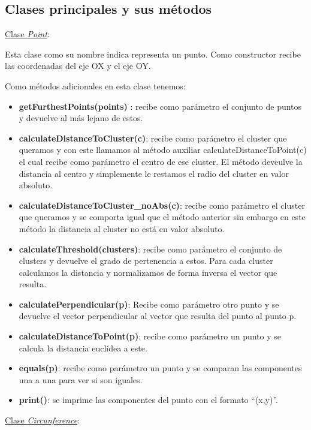 \documentclass[conference,a4paper]{IEEEtran}
\begin{document}
\subsection{Clases principales y sus métodos}

\underline{Clase \textit{Point}}:

Esta clase como su nombre indica representa un punto. Como constructor recibe las coordenadas del eje OX y el eje OY.

Como métodos adicionales en esta clase tenemos:

\begin{itemize}

	\item{\textbf{getFurthestPoints(points)	}: recibe como parámetro el conjunto de puntos y devuelve al más lejano de estos.}
	\item{\textbf{calculateDistanceToCluster(c)}: recibe como parámetro el cluster que queramos y con este llamamos al método auxiliar calculateDistanceToPoint(c) el cual recibe como parámetro el centro de ese cluster. El método deveulve la distancia al centro y simplemente le restamos el radio del cluster en valor absoluto.}
	\item{\textbf{calculateDistanceToCluster\_noAbs(c)}: recibe como parámetro el cluster que queramos y se comporta igual que el método anterior sin embargo en este método la distancia al cluster no está en valor absoluto.}
	\item{\textbf{calculateThreshold(clusters)}: recibe como parámetro el conjunto de clusters y devuelve el grado de pertenencia a estos. Para cada cluster calculamos la distancia y normalizamos de forma inversa el vector que resulta.}
	\item{\textbf{calculatePerpendicular(p)}: Recibe como parámetro otro punto y se devuelve el vector perpendicular al vector que resulta del punto al punto p.}
	\item{\textbf{calculateDistanceToPoint(p)}: recibe como parámetro un punto y se calcula la distancia euclídea a este.}
	\item{\textbf{equals(p)}: recibe como parámetro un punto y se comparan las componentes una a una para ver si son iguales.}
	\item{\textbf{print()}: se imprime las componentes del punto con el formato “(x,y)”.}

\end{itemize}

\underline{Clase \textit{Circunference}}:
\end{document}
